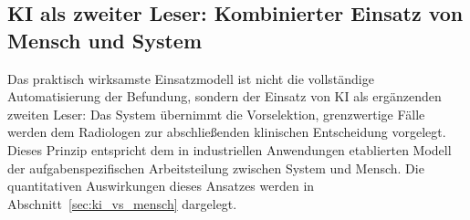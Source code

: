 \subsection{KI als \glqq zweiter Leser\grqq{}: Kombinierter Einsatz von Mensch und System}
\label{sec:zweiter_leser}

Das praktisch wirksamste Einsatzmodell ist nicht die vollständige Automatisierung der
Befundung, sondern der Einsatz von KI als ergänzenden zweiten Leser: Das System
übernimmt die Vorselektion, grenzwertige Fälle werden dem Radiologen zur abschließenden
klinischen Entscheidung vorgelegt. Dieses Prinzip entspricht dem in industriellen
Anwendungen etablierten Modell der aufgabenspezifischen Arbeitsteilung zwischen System
und Mensch. Die quantitativen Auswirkungen dieses Ansatzes werden in
Abschnitt~\ref{sec:ki_vs_mensch} dargelegt.
